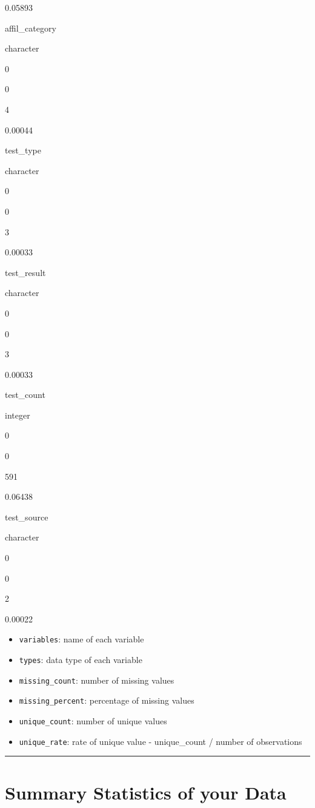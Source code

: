 \documentclass[
  letterpaper,
  DIV=11,
  numbers=noendperiod]{scrreprt}
\providecommand{\tightlist}{%
  \setlength{\itemsep}{0pt}\setlength{\parskip}{0pt}}\usepackage{longtable,booktabs,array}
\begin{document}
0.05893

affil\_category

character

0

0

4

0.00044

test\_type

character

0

0

3

0.00033

test\_result

character

0

0

3

0.00033

test\_count

integer

0

0

591

0.06438

test\_source

character

0

0

2

0.00022

\begin{itemize}
\tightlist
\item
  \texttt{variables}: name of each variable
\item
  \texttt{types}: data type of each variable
\item
  \texttt{missing\_count}: number of missing values
\item
  \texttt{missing\_percent}: percentage of missing values
\item
  \texttt{unique\_count}: number of unique values
\item
  \texttt{unique\_rate}: rate of unique value - unique\_count / number
  of observations
\end{itemize}

\begin{center}\rule{0.5\linewidth}{0.5pt}\end{center}

\hypertarget{summary-statistics-of-your-data}{%
\section{Summary Statistics of your
Data}\label{summary-statistics-of-your-data}}
\end{document}
